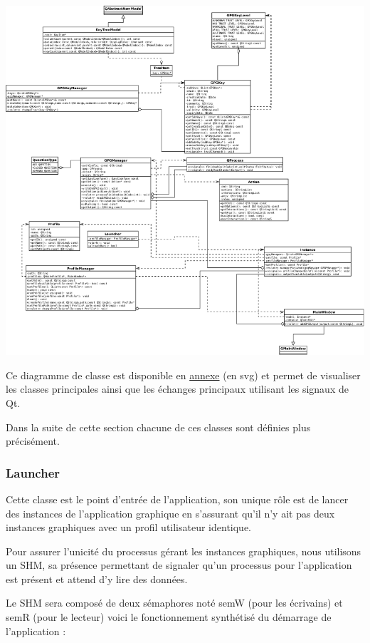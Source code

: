 \documentclass{../res/univ-projet}
\begin{document}
    \begin{center}
    \includegraphics[scale=.5]{graphics/diagramme-classes.png}
    
    Ce diagramme de classe est disponible en \href{diagramme-classes.svg}{annexe} (en svg)
    et permet de visualiser les classes principales ainsi que les échanges principaux utilisant
    les signaux de Qt.
    \end{center}

      Dans la suite de cette section chacune de ces classes sont définies plus précisément.

      \subsubsection{Launcher}

        Cette classe est le point d'entrée de l'application, son unique rôle est de lancer des instances de l'application
        graphique en s'assurant qu'il n'y ait pas deux instances graphiques avec un profil utilisateur
        identique.
        
        Pour assurer l'unicité du processus gérant les instances graphiques, nous utilisons un SHM,
        sa présence permettant de signaler qu'un processus pour l'application est présent et attend
        d'y lire des données.
        
        Le SHM sera composé de deux sémaphores noté semW (pour les écrivains) et semR (pour le lecteur)
        voici le fonctionnement synthétisé du démarrage de l'application :
\end{document}
